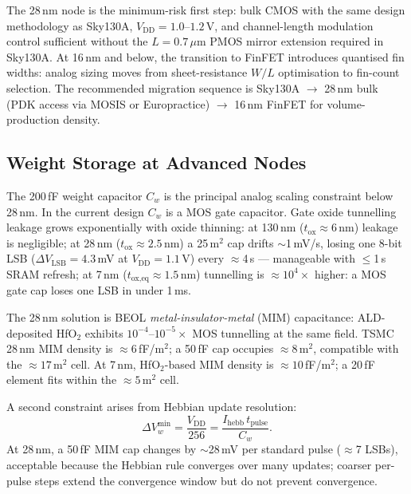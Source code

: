 \documentclass[journal,10pt,twoside]{IEEEtran}
\begin{document}
The 28\,nm node is the minimum-risk first step: bulk CMOS with the same
design methodology as Sky130A, $V_\text{DD} = 1.0$--$1.2\,\text{V}$,
and channel-length modulation control sufficient without the
$L = 0.7\,\mu$m PMOS mirror extension required in Sky130A.
At 16\,nm and below, the transition to FinFET introduces quantised fin
widths: analog sizing moves from sheet-resistance $W/L$ optimisation to
fin-count selection.
The recommended migration sequence is Sky130A $\to$ 28\,nm bulk
(PDK access via MOSIS or Europractice)
$\to$ 16\,nm FinFET for volume-production density.

\subsection{Weight Storage at Advanced Nodes}
\label{sec:cw_scaling}

The 200\,fF weight capacitor $C_w$ is the principal analog scaling constraint
below 28\,nm.
In the current design $C_w$ is a MOS gate capacitor.
Gate oxide tunnelling leakage grows exponentially with oxide thinning:
at 130\,nm ($t_\text{ox} \approx 6$\,nm) leakage is negligible;
at 28\,nm ($t_\text{ox} \approx 2.5$\,nm) a 25\,\textmu m$^2$ cap drifts
$\sim$1\,mV/s, losing one 8-bit LSB
($\Delta V_\text{LSB} = 4.3$\,mV at $V_\text{DD}=1.1$\,V) every $\approx$4\,s —
manageable with $\leq$1\,s SRAM refresh;
at 7\,nm ($t_\text{ox,eq} \approx 1.5$\,nm) tunnelling is $\approx 10^4\times$
higher: a MOS gate cap loses one LSB in under 1\,ms.

The 28\,nm solution is BEOL \emph{metal-insulator-metal} (MIM) capacitance:
ALD-deposited HfO$_2$ exhibits $10^{-4}$--$10^{-5}\times$ MOS tunnelling at
the same field.
TSMC 28\,nm MIM density is $\approx 6$\,fF/\textmu m$^2$;
a 50\,fF cap occupies $\approx 8$\,\textmu m$^2$, compatible with the
$\approx 17$\,\textmu m$^2$ cell.
At 7\,nm, HfO$_2$-based MIM density is $\approx 10$\,fF/\textmu m$^2$;
a 20\,fF element fits within the $\approx 5$\,\textmu m$^2$ cell.

A second constraint arises from Hebbian update resolution:
\begin{equation}
\Delta V_w^\text{min} = \frac{V_\text{DD}}{256}
  = \frac{I_\text{hebb}\,t_\text{pulse}}{C_w}.
\end{equation}
At 28\,nm, a 50\,fF MIM cap changes by $\sim$28\,mV per standard pulse
($\approx$7 LSBs), acceptable because the Hebbian rule converges over many
updates; coarser per-pulse steps extend the convergence window but do not
prevent convergence.
\end{document}
